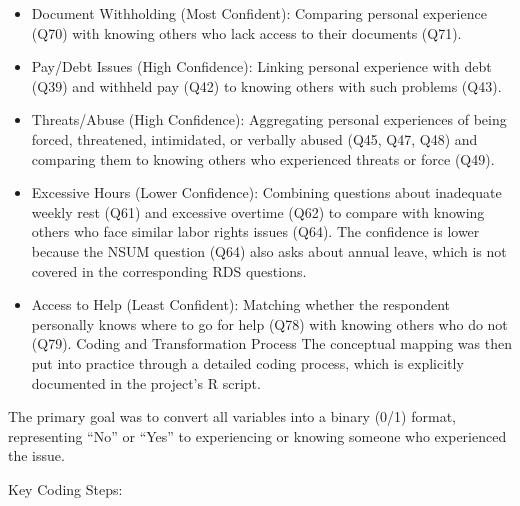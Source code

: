 \documentclass[
  12pt,
  letterpaper,
  DIV=11,
  numbers=noendperiod]{scrartcl}
\providecommand{\tightlist}{%
  \setlength{\itemsep}{0pt}\setlength{\parskip}{0pt}}
\theoremstyle{plain}
\theoremstyle{definition}
\begin{document}
\begin{itemize}
\tightlist
\item
  Document Withholding (Most Confident): Comparing personal experience
  (Q70) with knowing others who lack access to their documents (Q71).
\item
  Pay/Debt Issues (High Confidence): Linking personal experience with
  debt (Q39) and withheld pay (Q42) to knowing others with such problems
  (Q43).
\item
  Threats/Abuse (High Confidence): Aggregating personal experiences of
  being forced, threatened, intimidated, or verbally abused (Q45, Q47,
  Q48) and comparing them to knowing others who experienced threats or
  force (Q49).
\item
  Excessive Hours (Lower Confidence): Combining questions about
  inadequate weekly rest (Q61) and excessive overtime (Q62) to compare
  with knowing others who face similar labor rights issues (Q64). The
  confidence is lower because the NSUM question (Q64) also asks about
  annual leave, which is not covered in the corresponding RDS questions.
\item
  Access to Help (Least Confident): Matching whether the respondent
  personally knows where to go for help (Q78) with knowing others who do
  not (Q79). Coding and Transformation Process The conceptual mapping
  was then put into practice through a detailed coding process, which is
  explicitly documented in the project's R script.
\end{itemize}

The primary goal was to convert all variables into a binary (0/1)
format, representing ``No'' or ``Yes'' to experiencing or knowing
someone who experienced the issue.

Key Coding Steps:
\end{document}
